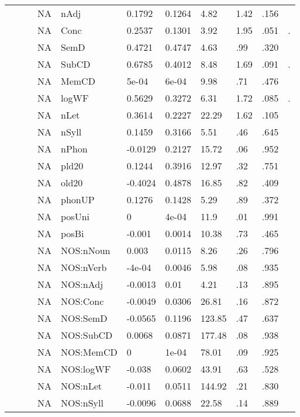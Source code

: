 \begin{table}[ht]
\begin{tabular}{lllllllllll}
   &  &  & NA & nAdj & 0.1792 & 0.1264 & 4.82 & 1.42 & .156 &   \\ 
   &  &  & NA & Conc & 0.2537 & 0.1301 & 3.92 & 1.95 & .051 & . \\ 
   &  &  & NA & SemD & 0.4721 & 0.4747 & 4.63 & .99 & .320 &   \\ 
   &  &  & NA & SubCD & 0.6785 & 0.4012 & 8.48 & 1.69 & .091 & . \\ 
   &  &  & NA & MemCD & 5e-04 & 6e-04 & 9.98 & .71 & .476 &   \\ 
   &  &  & NA & logWF & 0.5629 & 0.3272 & 6.31 & 1.72 & .085 & . \\ 
   &  &  & NA & nLet & 0.3614 & 0.2227 & 22.29 & 1.62 & .105 &   \\ 
   &  &  & NA & nSyll & 0.1459 & 0.3166 & 5.51 & .46 & .645 &   \\ 
   &  &  & NA & nPhon & -0.0129 & 0.2127 & 15.72 & .06 & .952 &   \\ 
   &  &  & NA & pld20 & 0.1244 & 0.3916 & 12.97 & .32 & .751 &   \\ 
   &  &  & NA & old20 & -0.4024 & 0.4878 & 16.85 & .82 & .409 &   \\ 
   &  &  & NA & phonUP & 0.1276 & 0.1428 & 5.29 & .89 & .372 &   \\ 
   &  &  & NA & posUni & 0 & 4e-04 & 11.9 & .01 & .991 &   \\ 
   &  &  & NA & posBi & -0.001 & 0.0014 & 10.38 & .73 & .465 &   \\ 
   &  &  & NA & NOS:nNoun & 0.003 & 0.0115 & 8.26 & .26 & .796 &   \\ 
   &  &  & NA & NOS:nVerb & -4e-04 & 0.0046 & 5.98 & .08 & .935 &   \\ 
   &  &  & NA & NOS:nAdj & -0.0013 & 0.01 & 4.21 & .13 & .895 &   \\ 
   &  &  & NA & NOS:Conc & -0.0049 & 0.0306 & 26.81 & .16 & .872 &   \\ 
   &  &  & NA & NOS:SemD & -0.0565 & 0.1196 & 123.85 & .47 & .637 &   \\ 
   &  &  & NA & NOS:SubCD & 0.0068 & 0.0871 & 177.48 & .08 & .938 &   \\ 
   &  &  & NA & NOS:MemCD & 0 & 1e-04 & 78.01 & .09 & .925 &   \\ 
   &  &  & NA & NOS:logWF & -0.038 & 0.0602 & 43.91 & .63 & .528 &   \\ 
   &  &  & NA & NOS:nLet & -0.011 & 0.0511 & 144.92 & .21 & .830 &   \\ 
   &  &  & NA & NOS:nSyll & -0.0096 & 0.0688 & 22.58 & .14 & .889 &   \\ 

\end{tabular}
\end{table}
